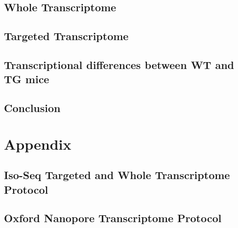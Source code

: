 \documentclass[a4paper,12pt,oneside]{report}
\begin{document}
\chapter{Whole Transcriptome}


\chapter{Targeted Transcriptome}


\chapter{Transcriptional differences between WT and TG mice}
%
%


\chapter{Conclusion}
%

\newpage
\part{Appendix} %
\begin{appendix}
\chapter{Iso-Seq Targeted and Whole Transcriptome Protocol}

\chapter{Oxford Nanopore Transcriptome Protocol}
%
\end{appendix}



\end{document}
